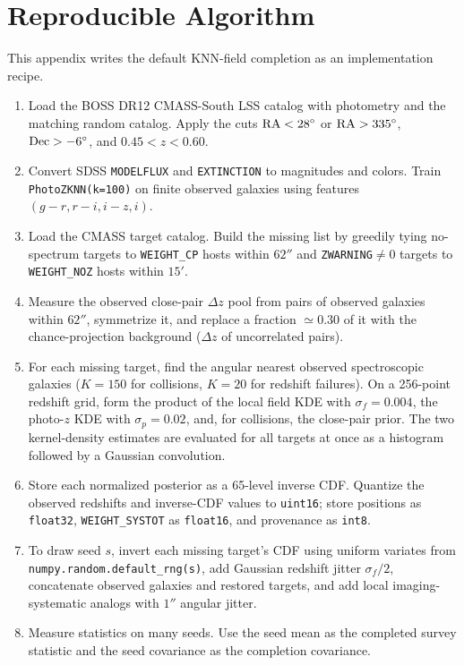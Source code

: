 \documentclass[apj]{emulateapj}
\begin{document}
\appendix

\section{Reproducible Algorithm}
\label{app:algorithm}

This appendix writes the default KNN-field completion as an implementation
recipe.

\begin{enumerate}
\item Load the BOSS DR12 CMASS-South LSS catalog with photometry and the matching
random catalog.  Apply the cuts ${\rm RA}<28^\circ$ or ${\rm RA}>335^\circ$,
${\rm Dec}>-6^\circ$, and $0.45<z<0.60$.
\item Convert SDSS \texttt{MODELFLUX} and \texttt{EXTINCTION} to magnitudes and
colors.  Train \texttt{PhotoZKNN(k=100)} on finite observed galaxies using
features $(g-r,r-i,i-z,i)$.
\item Load the CMASS target catalog.  Build the missing list by greedily tying
no-spectrum targets to \texttt{WEIGHT\_CP} hosts within $62''$ and
\texttt{ZWARNING}$\ne0$ targets to \texttt{WEIGHT\_NOZ} hosts within $15'$.
\item Measure the observed close-pair $\Delta z$ pool from pairs of observed
galaxies within $62''$, symmetrize it, and replace a fraction $\simeq0.30$ of it
with the chance-projection background ($\Delta z$ of uncorrelated pairs).
\item For each missing target, find the angular nearest observed spectroscopic
galaxies ($K=150$ for collisions, $K=20$ for redshift failures).  On a 256-point
redshift grid, form the product of the local field KDE with $\sigma_f=0.004$, the
photo-$z$ KDE with $\sigma_p=0.02$, and, for collisions, the close-pair prior.
The two kernel-density estimates are evaluated for all targets at once as a
histogram followed by a Gaussian convolution.
\item Store each normalized posterior as a 65-level inverse CDF.  Quantize the
observed redshifts and inverse-CDF values to \texttt{uint16}; store positions
as \texttt{float32}, \texttt{WEIGHT\_SYSTOT} as \texttt{float16}, and provenance
as \texttt{int8}.
\item To draw seed $s$, invert each missing target's CDF using uniform variates
from \texttt{numpy.random.default\_rng(s)}, add Gaussian redshift jitter
$\sigma_f/2$, concatenate observed galaxies and restored targets, and add local
imaging-systematic analogs with $1''$ angular jitter.
\item Measure statistics on many seeds.  Use the seed mean as the completed
survey statistic and the seed covariance as the completion covariance.
\end{enumerate}
\end{document}
